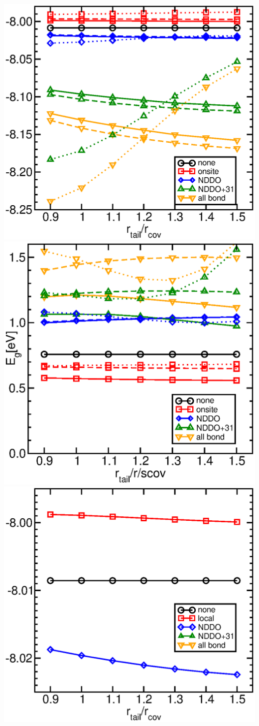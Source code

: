 \documentclass[11pt,a4paper]{report}
\begin{document}
\begin{itemize}
\begin{center}
\includegraphics[width=0.4\linewidth,clip=true]{Figs/Eofrtailsi/eofrtail.eps}
\includegraphics[width=0.4\linewidth,clip=true]{Figs/Gapofrtailsi/gapofrtail.eps}
\\
\includegraphics[width=0.4\linewidth,clip=true]
{Figs/Eofrtailsi/eofrtailsi110hr.eps}
\end{center}
\end{itemize}
\end{document}

